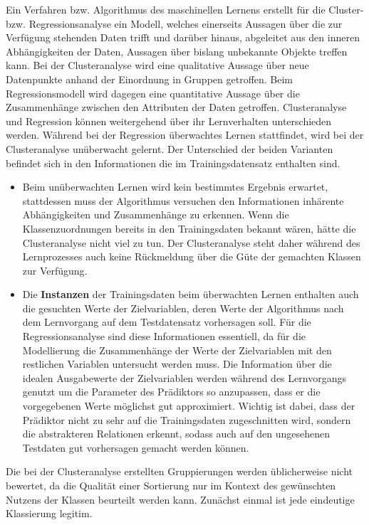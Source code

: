 \documentclass[
	twoside,
	12pt,
	a4paper,
	BCOR10mm,
	DIV14,
	listof=totoc,
	bibliography=totoc,
	headsepline
]{scrreprt}
\begin{document}
Ein Verfahren bzw. Algorithmus des maschinellen Lernens erstellt für die Cluster- bzw. Regressionsanalyse ein Modell, welches einerseits Aussagen über die zur Verfügung stehenden Daten trifft und darüber hinaus, abgeleitet aus den inneren Abhängigkeiten der Daten, Aussagen über bislang unbekannte Objekte treffen kann.
Bei der Clusteranalyse wird eine qualitative Aussage über neue Datenpunkte anhand der Einordnung in Gruppen getroffen.
Beim Regressionsmodell wird dagegen eine quantitative Aussage über die Zusammenhänge zwischen den Attributen der Daten getroffen. 
Clusteranalyse und Regression können weitergehend über ihr Lernverhalten unterschieden werden.
Während bei der Regression überwachtes Lernen stattfindet, wird bei der Clusteranalyse unüberwacht gelernt. Der Unterschied der beiden Varianten befindet sich in den Informationen die im Trainingsdatensatz enthalten sind.
\begin{itemize}
\item Beim unüberwachten Lernen wird kein bestimmtes Ergebnis erwartet, stattdessen muss der Algorithmus versuchen den Informationen inhärente Abhängigkeiten und Zusammenhänge zu erkennen.
Wenn die Klassenzuordnungen bereits in den Trainingsdaten bekannt wären, hätte die Clusteranalyse nicht viel zu tun. 
Der Clusteranalyse steht daher während des Lernprozesses auch keine Rückmeldung über die Güte der gemachten Klassen zur Verfügung.
\item Die \textbf{Instanzen} der Trainingsdaten beim überwachten Lernen enthalten auch die gesuchten Werte der Zielvariablen, deren Werte der Algorithmus nach dem Lernvorgang auf dem Testdatensatz vorhersagen soll.
Für die Regressionsanalyse sind diese Informationen essentiell, da für die Modellierung die Zusammenhänge der Werte der Zielvariablen mit den restlichen Variablen untersucht werden muss.
Die Information über die idealen Ausgabewerte der Zielvariablen werden während des Lernvorgangs genutzt um die Parameter des Prädiktors so anzupassen, dass er die vorgegebenen Werte möglichst gut approximiert. Wichtig ist dabei, dass der Prädiktor nicht zu sehr auf die Trainingsdaten zugeschnitten wird, sondern die abstrakteren Relationen erkennt, sodass auch auf den ungesehenen Testdaten gut vorhersagen gemacht werden können.
\end{itemize}

Die bei der Clusteranalyse erstellten Gruppierungen werden üblicherweise nicht bewertet, da die Qualität einer Sortierung nur im Kontext des gewünschten Nutzens der Klassen beurteilt werden kann.
Zunächst einmal ist jede eindeutige Klassierung legitim.
\end{document}
